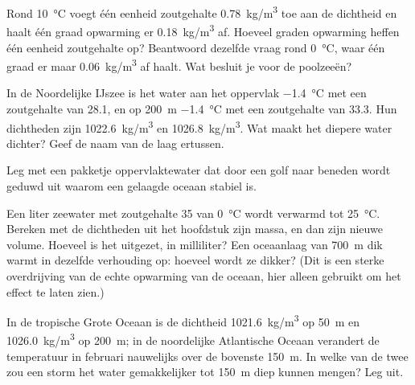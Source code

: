\begin{exercise}[$\star\star$]\label{exo:g10:layered-ocean:9}
Rond \qty{10}{\degreeCelsius} voegt één eenheid zoutgehalte
\qty{0.78}{kg/m^3} toe aan de dichtheid en haalt één graad opwarming er
\qty{0.18}{kg/m^3} af. Hoeveel graden opwarming heffen één eenheid zoutgehalte
op? Beantwoord dezelfde vraag rond \qty{0}{\degreeCelsius}, waar één graad er
maar \qty{0.06}{kg/m^3} af haalt. Wat besluit je voor de
poolzeeën?
\end{exercise}

\begin{exercise}[$\star\star$]\label{exo:g10:layered-ocean:10}
In de Noordelijke IJszee is het water aan het oppervlak \qty{-1.4}{\degreeCelsius}
met een zoutgehalte van 28.1, en op \qty{200}{m} \qty{-1.4}{\degreeCelsius}
met een zoutgehalte van 33.3. Hun dichtheden zijn \qty{1022.6}{kg/m^3} en
\qty{1026.8}{kg/m^3}. Wat maakt het diepere water dichter? Geef de naam van de
laag ertussen.
\end{exercise}

\begin{exercise}[$\star\star$]\label{exo:g10:layered-ocean:11}
Leg met een pakketje oppervlaktewater dat door een golf naar beneden wordt
geduwd uit waarom een gelaagde oceaan stabiel is.
\end{exercise}

\begin{exercise}[$\star\star\star$]\label{exo:g10:layered-ocean:12}
Een liter zeewater met zoutgehalte 35 van \qty{0}{\degreeCelsius} wordt
verwarmd tot \qty{25}{\degreeCelsius}. Bereken met de dichtheden uit het
hoofdstuk zijn massa, en dan zijn nieuwe volume. Hoeveel is het uitgezet, in
milliliter? Een oceaanlaag van \qty{700}{m} dik warmt in dezelfde verhouding op:
hoeveel wordt ze dikker? (Dit is een sterke overdrijving van de echte
opwarming van de oceaan, hier alleen gebruikt om het effect te laten zien.)
\end{exercise}

\begin{exercise}[$\star\star\star$]\label{exo:g10:layered-ocean:13}
In de tropische Grote Oceaan is de dichtheid \qty{1021.6}{kg/m^3} op \qty{50}{m}
en \qty{1026.0}{kg/m^3} op \qty{200}{m}; in de noordelijke Atlantische Oceaan
verandert de temperatuur in februari nauwelijks over de bovenste \qty{150}{m}.
In welke van de twee zou een storm het water gemakkelijker tot \qty{150}{m}
diep kunnen mengen? Leg uit.
\end{exercise}

